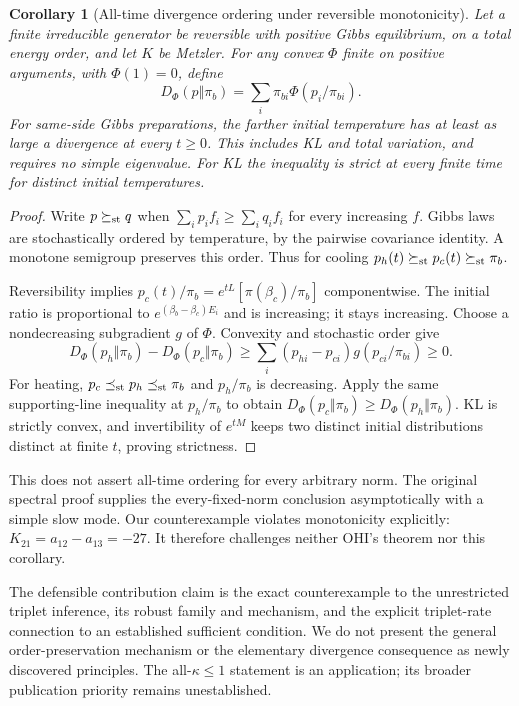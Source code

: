 \documentclass[11pt]{article}
\newtheorem{corollary}{Corollary}
\begin{document}
\begin{corollary}[All-time divergence ordering under reversible monotonicity]
Let a finite irreducible generator be reversible with positive Gibbs equilibrium, on a total energy order, and let $K$ be Metzler. For any convex $\Phi$ finite on positive arguments, with $\Phi(1)=0$, define
\[
D_\Phi(p\Vert\pi_b)=\sum_i\pi_{bi}\Phi(p_i/\pi_{bi}).
\]
For same-side Gibbs preparations, the farther initial temperature has at least as large a divergence at every $t\geq0$. This includes KL and total variation, and requires no simple eigenvalue. For KL the inequality is strict at every finite time for distinct initial temperatures.
\end{corollary}
\begin{proof}
Write $p\succeq_{\rm st}q$ when $\sum_i p_i f_i\geq\sum_i q_i f_i$ for every increasing $f$. Gibbs laws are stochastically ordered by temperature, by the pairwise covariance identity. A monotone semigroup preserves this order. Thus for cooling $p_h(t)\succeq_{\rm st}p_c(t)\succeq_{\rm st}\pi_b$.

Reversibility implies $p_c(t)/\pi_b=e^{tL}[\pi(\beta_c)/\pi_b]$ componentwise. The initial ratio is proportional to $e^{(\beta_b-\beta_c)E_i}$ and is increasing; it stays increasing. Choose a nondecreasing subgradient $g$ of $\Phi$. Convexity and stochastic order give
\[
D_\Phi(p_h\Vert\pi_b)-D_\Phi(p_c\Vert\pi_b)
\geq\sum_i(p_{hi}-p_{ci})g(p_{ci}/\pi_{bi})\geq0.
\]
For heating, $p_c\preceq_{\rm st}p_h\preceq_{\rm st}\pi_b$ and $p_h/\pi_b$ is decreasing. Apply the same supporting-line inequality at $p_h/\pi_b$ to obtain $D_\Phi(p_c\Vert\pi_b)\geq D_\Phi(p_h\Vert\pi_b)$. KL is strictly convex, and invertibility of $e^{tM}$ keeps two distinct initial distributions distinct at finite $t$, proving strictness.
\end{proof}
This does not assert all-time ordering for every arbitrary norm. The original spectral proof supplies the every-fixed-norm conclusion asymptotically with a simple slow mode. Our counterexample violates monotonicity explicitly: $K_{21}=a_{12}-a_{13}=-27$. It therefore challenges neither OHI's theorem nor this corollary.

The defensible contribution claim is the exact counterexample to the unrestricted triplet inference, its robust family and mechanism, and the explicit triplet-rate connection to an established sufficient condition. We do not present the general order-preservation mechanism or the elementary divergence consequence as newly discovered principles. The all-$\kappa\leq1$ statement is an application; its broader publication priority remains unestablished.
\end{document}
